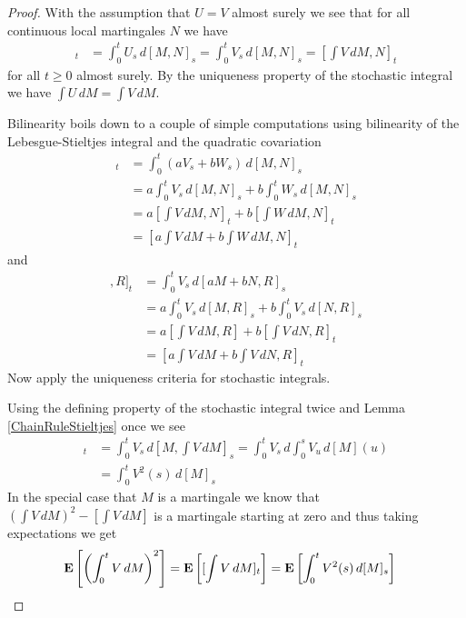 \begin{proof}
With the assumption that $U = V$ almost surely we see that for all continuous local martingales $N$ we have
\begin{align*}
[\int U \, dM, N]_t &= \int_0^t U_s \, d[M,N]_s = \int_0^t V_s \, d[M,N]_s = [\int V \, dM, N]_t
\end{align*}
for all $t \geq 0$ almost surely.  By the uniqueness property of the stochastic integral we have $\int U \, dM = \int V \, dM$.

Bilinearity boils down to a couple of simple computations using bilinearity of the Lebesgue-Stieltjes integral and the quadratic covariation
\begin{align*}
[\int (aV + bU) \, dM, N]_t &= \int_0^t (aV_s + bW_s) \, d[M,N]_s \\
&= a\int_0^t V_s \, d[M,N]_s + b\int_0^t W_s \, d[M,N]_s \\
&= a[\int V \, dM, N]_t + b[\int W \, dM, N]_t \\
&= [a\int V \, dM + b\int W \, dM, N]_t
\end{align*}
and
\begin{align*}
[\int V \, d[aM + bN], R]_t &= \int_0^t V_s \, d[aM+bN, R]_s \\
&= a\int_0^t V_s \, d[M, R]_s + b\int_0^t V_s \, d[N, R]_s \\
&= a[\int V \, dM, R] + b[\int V \, dN, R]_t \\
&= [a\int V \, dM + b\int V \, dN, R]_t
\end{align*}
Now apply the uniqueness criteria for stochastic integrals.

Using the defining property of the stochastic integral twice and Lemma \ref{ChainRuleStieltjes} once we see
\begin{align*}
[\int V \, dM]_t &= \int_0^t V_s \, d[M, \int V \, dM]_s = \int_0^t V_s \, d\int_0^s V_u \, d[M](u) \\
&= \int_0^t V^2(s) \, d[M]_s
\end{align*}
In the special case that $M$ is a martingale we know that $\left(\int V \, dM\right)^2 - [\int V \, dM]$ is a martingale starting at zero and thus taking expectations we get
\begin{align*}
\textbf{E}\left[\left( \int_0^t V \, dM\right)^2\right] &= \textbf{E}\left[[\int V \, dM]_t\right] = \textbf{E}\left[\int_0^t V^2(s) \, d[M]_s\right]
\end{align*}
\end{proof}

